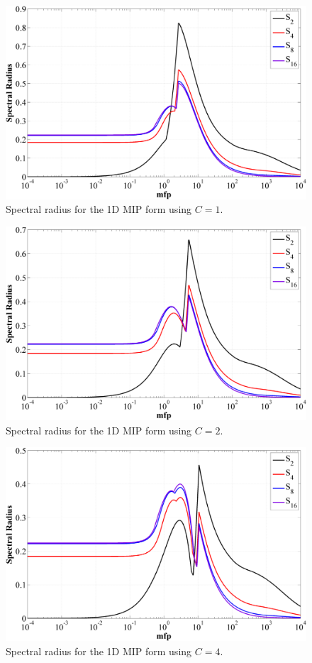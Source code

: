 \begin{figure}
\label{fig::1D_MIP_c=1}
\centering
\includegraphics[width=\textwidth]{figures/appendices/DSA_1D_SI_MIP_C=1.png}
\caption{Spectral radius for the 1D MIP form using $C=1$.}
\end{figure}

\begin{figure}
\label{fig::1D_MIP_c=2}
\centering
\includegraphics[width=\textwidth]{figures/appendices/DSA_1D_SI_MIP_C=2.png}
\caption{Spectral radius for the 1D MIP form using $C=2$.}
\end{figure}

\begin{figure}
\label{fig::1D_MIP_c=4}
\centering
\includegraphics[width=\textwidth]{figures/appendices/DSA_1D_SI_MIP_C=4.png}
\caption{Spectral radius for the 1D MIP form using $C=4$.}
\end{figure}

